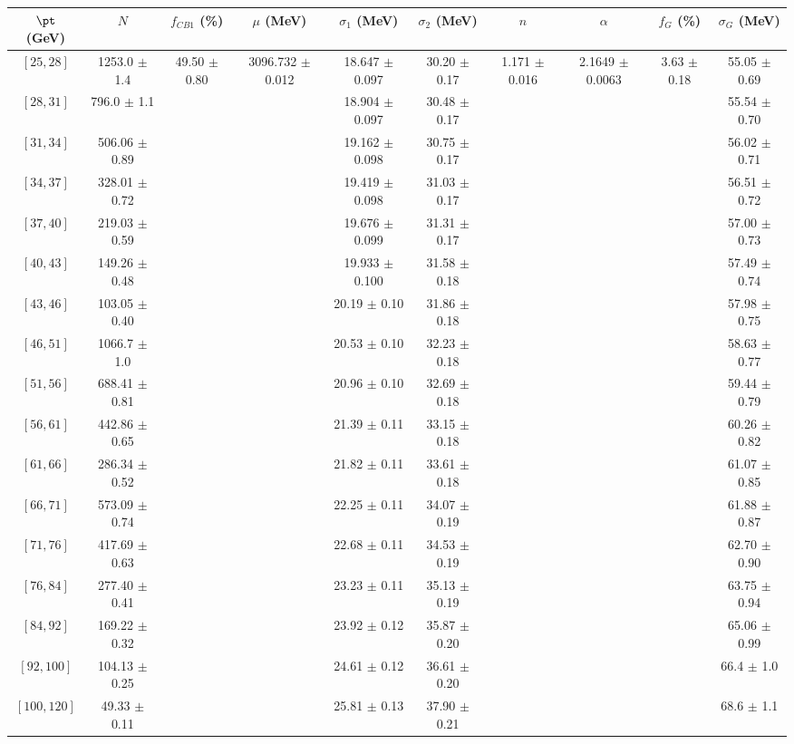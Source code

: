 \begin{tabular}{c||c|c|c|c|c|c|c|c|c}
$\pt$ (GeV) & $N$ & $f_{CB1}$ (\%)  & $\mu$ (MeV) & $\sigma_1$ (MeV) & $\sigma_2$ (MeV) & $n$ & $\alpha$ & $f_G$ (\%) & $\sigma_G$ (MeV) \\
\hline
$[25, 28]$ & 1253.0 $\pm$ 1.4 & \multirow{17}{*}{49.50 $\pm$ 0.80} & \multirow{17}{*}{3096.732 $\pm$ 0.012} & 18.647 $\pm$ 0.097 & 30.20 $\pm$ 0.17 & \multirow{17}{*}{1.171 $\pm$ 0.016} & \multirow{17}{*}{2.1649 $\pm$ 0.0063} & \multirow{17}{*}{3.63 $\pm$ 0.18} & 55.05 $\pm$ 0.69\\
$[28, 31]$ & 796.0 $\pm$ 1.1 &  &  & 18.904 $\pm$ 0.097 & 30.48 $\pm$ 0.17 &  &  &  & 55.54 $\pm$ 0.70\\
$[31, 34]$ & 506.06 $\pm$ 0.89 &  &  & 19.162 $\pm$ 0.098 & 30.75 $\pm$ 0.17 &  &  &  & 56.02 $\pm$ 0.71\\
$[34, 37]$ & 328.01 $\pm$ 0.72 &  &  & 19.419 $\pm$ 0.098 & 31.03 $\pm$ 0.17 &  &  &  & 56.51 $\pm$ 0.72\\
$[37, 40]$ & 219.03 $\pm$ 0.59 &  &  & 19.676 $\pm$ 0.099 & 31.31 $\pm$ 0.17 &  &  &  & 57.00 $\pm$ 0.73\\
$[40, 43]$ & 149.26 $\pm$ 0.48 &  &  & 19.933 $\pm$ 0.100 & 31.58 $\pm$ 0.18 &  &  &  & 57.49 $\pm$ 0.74\\
$[43, 46]$ & 103.05 $\pm$ 0.40 &  &  & 20.19 $\pm$ 0.10 & 31.86 $\pm$ 0.18 &  &  &  & 57.98 $\pm$ 0.75\\
$[46, 51]$ & 1066.7 $\pm$ 1.0 &  &  & 20.53 $\pm$ 0.10 & 32.23 $\pm$ 0.18 &  &  &  & 58.63 $\pm$ 0.77\\
$[51, 56]$ & 688.41 $\pm$ 0.81 &  &  & 20.96 $\pm$ 0.10 & 32.69 $\pm$ 0.18 &  &  &  & 59.44 $\pm$ 0.79\\
$[56, 61]$ & 442.86 $\pm$ 0.65 &  &  & 21.39 $\pm$ 0.11 & 33.15 $\pm$ 0.18 &  &  &  & 60.26 $\pm$ 0.82\\
$[61, 66]$ & 286.34 $\pm$ 0.52 &  &  & 21.82 $\pm$ 0.11 & 33.61 $\pm$ 0.18 &  &  &  & 61.07 $\pm$ 0.85\\
$[66, 71]$ & 573.09 $\pm$ 0.74 &  &  & 22.25 $\pm$ 0.11 & 34.07 $\pm$ 0.19 &  &  &  & 61.88 $\pm$ 0.87\\
$[71, 76]$ & 417.69 $\pm$ 0.63 &  &  & 22.68 $\pm$ 0.11 & 34.53 $\pm$ 0.19 &  &  &  & 62.70 $\pm$ 0.90\\
$[76, 84]$ & 277.40 $\pm$ 0.41 &  &  & 23.23 $\pm$ 0.11 & 35.13 $\pm$ 0.19 &  &  &  & 63.75 $\pm$ 0.94\\
$[84, 92]$ & 169.22 $\pm$ 0.32 &  &  & 23.92 $\pm$ 0.12 & 35.87 $\pm$ 0.20 &  &  &  & 65.06 $\pm$ 0.99\\
$[92, 100]$ & 104.13 $\pm$ 0.25 &  &  & 24.61 $\pm$ 0.12 & 36.61 $\pm$ 0.20 &  &  &  & 66.4 $\pm$ 1.0\\
$[100, 120]$ & 49.33 $\pm$ 0.11 &  &  & 25.81 $\pm$ 0.13 & 37.90 $\pm$ 0.21 &  &  &  & 68.6 $\pm$ 1.1\\
\end{tabular}
